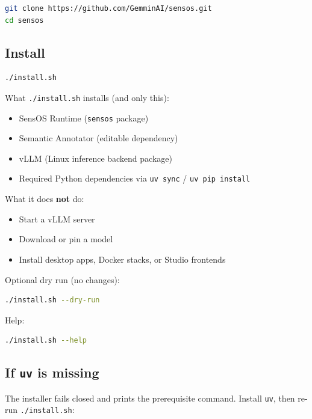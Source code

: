 \documentclass[11pt,a4paper,oneside]{article}
\newcommand{\pathcode}[1]{\texttt{#1}}
\begin{document}
\begin{lstlisting}[language=bash]
git clone https://github.com/GemminAI/sensos.git
cd sensos
\end{lstlisting}

\subsection{Install}

\begin{lstlisting}[language=bash]
./install.sh
\end{lstlisting}

What \pathcode{./install.sh} installs (and only this):

\begin{itemize}
  \item SensOS Runtime (\pathcode{sensos} package)
  \item Semantic Annotator (editable dependency)
  \item vLLM (Linux inference backend package)
  \item Required Python dependencies via \pathcode{uv sync} / \pathcode{uv pip install}
\end{itemize}

What it does \textbf{not} do:

\begin{itemize}
  \item Start a vLLM server
  \item Download or pin a model
  \item Install desktop apps, Docker stacks, or Studio frontends
\end{itemize}

Optional dry run (no changes):

\begin{lstlisting}[language=bash]
./install.sh --dry-run
\end{lstlisting}

Help:

\begin{lstlisting}[language=bash]
./install.sh --help
\end{lstlisting}

\subsection{If \texttt{uv} is missing}

The installer fails closed and prints the prerequisite command. Install \texttt{uv}, then re-run \pathcode{./install.sh}:
\end{document}
